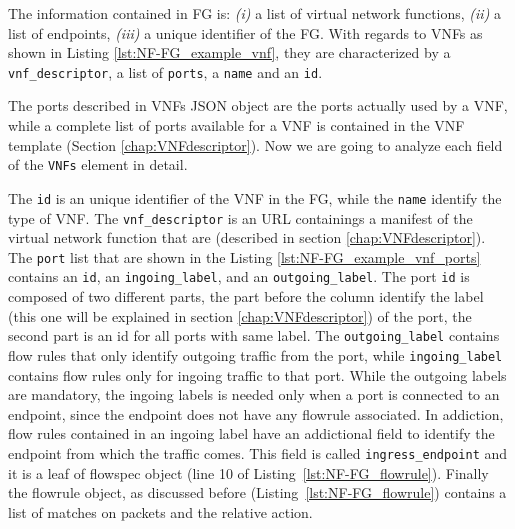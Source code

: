 

The information contained in FG is: \textit{(i)} a list of virtual network functions, \textit{(ii)} a list of endpoints, \textit{(iii)} a unique identifier of the FG.
With regards to VNFs as shown in Listing \ref{lst:NF-FG_example_vnf}, they are characterized by a \texttt{vnf\_descriptor}, a list of \texttt{ports}, a \texttt{name} and an \texttt{id}.



The ports described in VNFs JSON object are the ports actually used by a VNF, while a complete list of ports available for a VNF is contained in the VNF template (Section \ref{chap:VNFdescriptor}). Now we are going to analyze each field of the \texttt{VNFs} element in detail.

The \texttt{id} is an unique identifier of the VNF in the FG, while the \texttt{name} identify the type of VNF.
The \texttt{vnf\_descriptor} is an URL containings a manifest of the virtual network function that are (described in section \ref{chap:VNFdescriptor}).
The \texttt{port} list that are shown in the Listing \ref{lst:NF-FG_example_vnf_ports} contains an \texttt{id}, an \texttt{ingoing\_label}, and an \texttt{outgoing\_label}.
The port \texttt{id} is composed of two different parts, the part before the column identify the label (this one will be explained in section \ref{chap:VNFdescriptor}) of the port, the second part is an id for all ports with same label.  The \texttt{outgoing\_label} contains flow rules that only identify outgoing traffic from the port, while \texttt{ingoing\_label} contains flow rules only for ingoing traffic to that port.
While the outgoing labels are mandatory, the ingoing labels is needed only when a port is connected to an endpoint, since the endpoint does not have any flowrule associated.
In addiction, flow rules contained in an ingoing label have an addictional field to identify the endpoint from which the traffic comes. This field is called \texttt{ingress\_endpoint} and it is a leaf of flowspec object (line 10 of Listing~\ref{lst:NF-FG_flowrule}). Finally the flowrule object, as discussed before (Listing~\ref{lst:NF-FG_flowrule}) contains a list of matches on packets and the relative action. 




